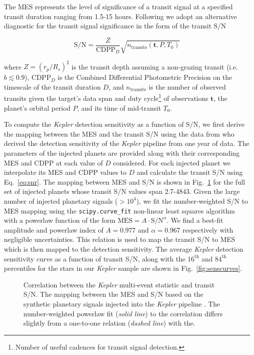 \documentclass[twocolumn]{emulateapj}
\newcommand{\kepler}[1]{\emph{Kepler}#1}
\begin{document}
The MES represents the level of significance of a transit signal at a specified transit duration ranging from
1.5-15 hours. Following \cite{petigura18} we adopt an alternative diagnostic for the transit signal significance
in the form of the transit S/N 

\begin{equation}
  \text{S/N} = \frac{Z}{\text{CDPP}_{D}} \sqrt{n_{\text{transits}}(\mathbf{t},P,T_0)}  \label{eq:snr}
\end{equation}

\noindent where $Z=(r_p/R_s)^2$ is the transit depth assuming a non-grazing transit (i.e. $b\lesssim 0.9$),
CDPP$_D$ is the Combined Differential Photometric
Precision on the timescale of the transit duration $D$, and $n_{\text{transits}}$ is the number of
observed transits given the target's data span and duty cycle\footnote{Number of useful cadences for transit signal
detection.} of observations $\textbf{t}$, the planet's orbital period $P$, and its time of mid-transit $T_0$.

To compute the \kepler{} detection sensitivity as a function of S/N, we first
derive the mapping between the MES and the transit S/N using the data from \cite{christiansen15} who
derived the detection sensitivity of the \kepler{} pipeline from one year of data. 
The parameters of the injected planets are provided along with their corresponding MES and CDPP at each value of
$D$ considered. For each injected planet we interpolate its MES and CDPP values to $D$ and calculate
the transit S/N using Eq.~\ref{eq:snr}. The mapping between MES and S/N is shown in Fig.~\ref{fig:messnr}
for the full set of injected planets whose transit S/N values span 2.7-4843. Given the large number of injected planetary
signals ($>10^4$), we fit the number-weighted S/N to MES mapping using the \texttt{scipy.curve\_fit} non-linear least
squares algorithm with a powerlaw function of the form $\text{MES} = A\cdot \text{S/N}^{\alpha}$. We find a best-fit
amplitude and powerlaw index of $A=0.977$ and $\alpha=0.967$ respectively with negligible uncertainties.
This relation is used to map the transit S/N to MES
which is then mapped to the detection sensitivity. The average \kepler{} detection sensitivity curve as a function of
transit S/N, along with the $16^{\text{th}}$ and $84^{\text{th}}$ percentiles for the stars in our \kepler{} sample
are shown in Fig.~\ref{fig:senscurves}.


\begin{figure}
  \centering
  \caption{Correlation between the \kepler{} multi-event statistic and transit S/N. The mapping between the MES and
    S/N based on the synthetic planetary signals injected into the \kepler{} pipeline \citep{christiansen15}.
    The number-weighted powerlaw fit (\emph{solid line}) to the correlation differs slightly from a one-to-one relation
    (\emph{dashed line}) with the.}  
  \label{fig:messnr}
\end{figure}
\end{document}
